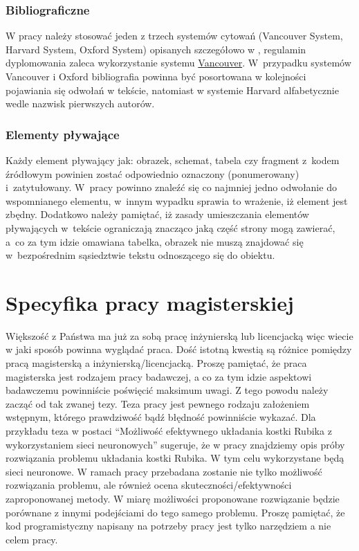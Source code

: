 \documentclass[12pt,a4paper]{article}
\begin{document}
\subsubsection{Bibliograficzne}
W pracy należy stosować jeden z trzech systemów cytowań (Vancouver System, Harvard System, Oxford System) opisanych szczegółowo w \cite{Cytowanie}, regulamin dyplomowania zaleca wykorzystanie systemu \underline{Vancouver}. W~przypadku systemów Vancouver i Oxford bibliografia powinna być posortowana w kolejności pojawiania się odwołań w tekście, natomiast w systemie Harvard alfabetycznie wedle nazwisk pierwszych autorów.

\subsubsection{Elementy pływające}
Każdy element pływający jak: obrazek, schemat, tabela czy fragment z~kodem źródłowym powinien zostać odpowiednio oznaczony (ponumerowany) i~zatytułowany. W~pracy powinno znaleźć się co najmniej jedno odwołanie do wspomnianego elementu, w~innym wypadku sprawia to wrażenie, iż element jest zbędny. Dodatkowo należy pamiętać, iż zasady umieszczania elementów pływających w~tekście ograniczają znacząco jaką część strony mogą zawierać, a~co za tym idzie omawiana tabelka, obrazek nie muszą znajdować się w~bezpośrednim sąsiedztwie tekstu odnoszącego się do obiektu.

\section{Specyfika pracy magisterskiej}
Większość z Państwa ma już za sobą pracę inżynierską lub licencjacką więc wiecie w jaki sposób powinna wyglądać praca. Dość istotną kwestią są różnice pomiędzy pracą magisterską a inżynierską/licencjacką. Proszę pamiętać, że praca magisterska jest rodzajem pracy badawczej, a co za tym idzie aspektowi badawczemu powinniście poświęcić maksimum uwagi. Z tego powodu należy zacząć od tak zwanej tezy. Teza pracy jest pewnego rodzaju założeniem wstępnym, którego prawdziwość bądź błędność powinniście wykazać. Dla przykładu teza w postaci ``Możliwość efektywnego układania kostki Rubika z wykorzystaniem sieci neuronowych'' sugeruje, że w pracy znajdziemy opis próby rozwiązania problemu układania kostki Rubika. W tym celu wykorzystane będą sieci neuronowe. W ramach pracy przebadana zostanie nie tylko możliwość rozwiązania problemu, ale również ocena skuteczności/efektywności zaproponowanej metody. W miarę możliwości proponowane rozwiązanie będzie porównane z innymi podejściami do tego samego problemu. Proszę pamiętać, że kod programistyczny napisany na potrzeby pracy jest tylko narzędziem a nie celem pracy.
\end{document}
